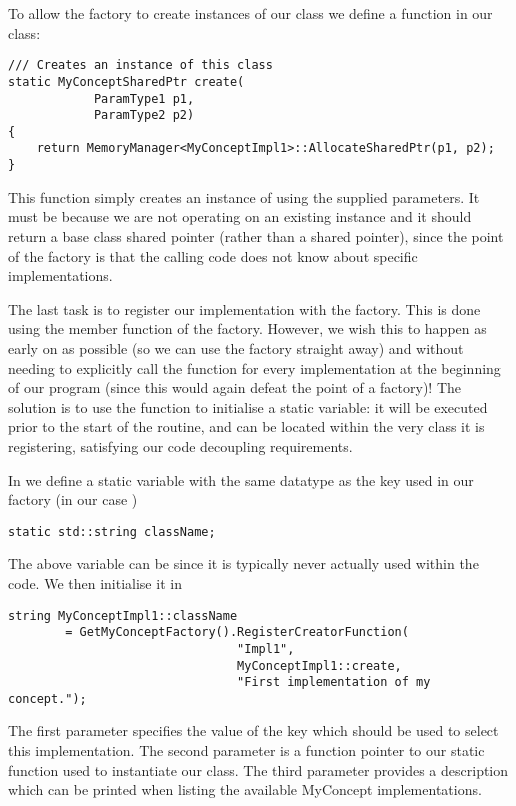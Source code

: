 To allow the factory to create instances of our class we define a function in 
our class:
\begin{lstlisting}[style=C++Style]
/// Creates an instance of this class
static MyConceptSharedPtr create(
            ParamType1 p1,
            ParamType2 p2)
{
    return MemoryManager<MyConceptImpl1>::AllocateSharedPtr(p1, p2);
}
\end{lstlisting}
This function simply creates an instance of  using the
supplied parameters. It must be  because we are not operating on
an existing instance and it should return a base class shared pointer (rather 
than a  shared pointer), since the point of the factory
is that the calling code does not know about specific implementations.

The last task is to register our implementation with the factory. This is done 
using the  member function of the factory.
However, we wish this to happen as early on as possible (so we can use the 
factory straight away) and without needing to explicitly call the function for 
every implementation at the beginning of our program (since this would again 
defeat the point of a factory)! The solution is to use the function to 
initialise a static variable: it will be executed prior to the start of the
 routine, and can be located within the very class it is
registering, satisfying our code decoupling requirements.

In  we define a static variable with the same datatype
as the key used in our factory (in our case ) 
\begin{lstlisting}[style=C++Style]
static std::string className;
\end{lstlisting}
The above variable can be  since it is typically never actually
used within the code. We then initialise it in 

\begin{lstlisting}[style=C++Style] 
string MyConceptImpl1::className
        = GetMyConceptFactory().RegisterCreatorFunction(
                                "Impl1", 
                                MyConceptImpl1::create, 
                                "First implementation of my concept.");
\end{lstlisting}
The first parameter specifies the value of the key which should be used to
select this implementation. The second parameter is a function pointer to our
static function used to instantiate our class. The third parameter provides a
description which can be printed when listing the available MyConcept
implementations.

